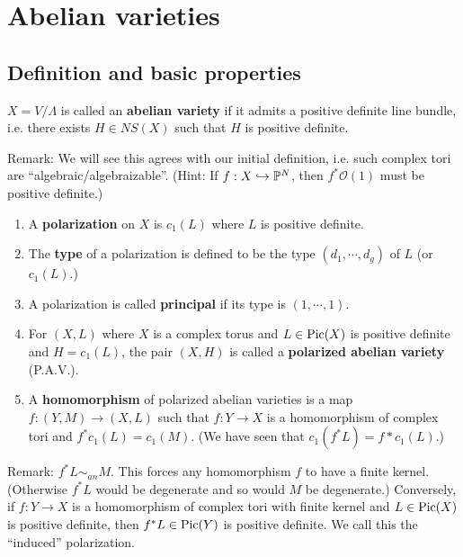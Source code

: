 



\section{Abelian varieties}\label{Chapters/3-abelianvarieties}

\subsection{Definition and basic properties}

\begin{definition}
$X=V/\Lambda$ is called an \textbf{abelian variety} if it admits a positive definite line bundle, i.e. there exists $H\in NS(X)$ such that $H$ is positive definite. 
\end{definition}

Remark: We will see this agrees with our initial definition, i.e. such complex tori are ``algebraic/algebraizable''. (Hint: If $f:X\hookrightarrow {\mathbb P}^N$, then $f^*\mathcal{O}(1)$ must be positive definite.)

\begin{definition}
\noindent
\begin{enumerate}
\item A \textbf{polarization} on $X$ is $c_1(L)$ where $L$ is positive definite.
\item The \textbf{type} of a polarization is defined to be the type $(d_1,\cdots, d_g)$ of $L$ (or $c_1(L)$.)
\item A polarization is called \textbf{principal} if its type is $(1,\cdots, 1)$. 
\item For $(X,L)$ where $X$ is a complex torus and $L\in \operatorname{Pic}(X)$ is positive definite and $H=c_1(L)$, the pair $(X,H)$ is called a \textbf{polarized abelian variety} (P.A.V.).
\item A \textbf{homomorphism} of polarized abelian varieties is a map $f:(Y,M)\to (X,L)$ such that $f:Y\to X$ is a homomorphism of complex tori and $f^* c_1(L)=c_1(M)$. (We have seen that $c_1(f^*L)=f* c_1(L)$.)
\end{enumerate}
\end{definition}

Remark: 
$f^*L\sim_{an} M$. This forces any homomorphism $f$ to have a finite kernel. (Otherwise $f^*L$ would be degenerate and so would $M$ be degenerate.) Conversely, if $f:Y\to X$ is a homomorphism of complex tori with finite kernel and $L\in \operatorname{Pic}(X)$ is positive definite, then $f^*L\in \operatorname{Pic}(Y)$ is positive definite. We call this the ``induced'' polarization. 

